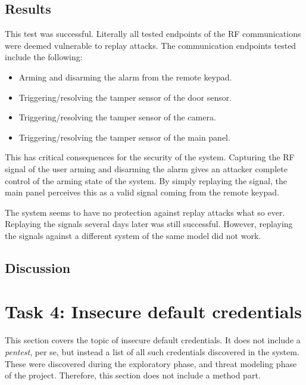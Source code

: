 \subsection{Results}
This test was successful. Literally all tested endpoints of the RF communications were deemed vulnerable to replay attacks. The communication endpoints tested include the following:
\begin{itemize}
    \item Arming and disarming the alarm from the remote keypad.
    \item Triggering/resolving the tamper sensor of the door sensor.
    \item Triggering/resolving the tamper sensor of the camera.
    \item Triggering/resolving the tamper sensor of the main panel.
\end{itemize}
This has critical consequences for the security of the system. Capturing the RF signal of the user arming and disarming the alarm gives an attacker complete control of the arming state of the system. By simply replaying the signal, the main panel perceives this as a valid signal coming from the remote keypad.

The system seems to have no protection against replay attacks what so ever. Replaying the signals several days later was still successful. However, replaying the signals against a different system of the same model did not work.

\subsection{Discussion}

\section{Task 4: Insecure default credentials}
This section covers the topic of insecure default credentials. It does not include a \textit{pentest}, per se, but instead a list of all such credentials discovered in the system. These were discovered during the exploratory phase, and threat modeling phase of the project. Therefore, this section does not include a method part.

